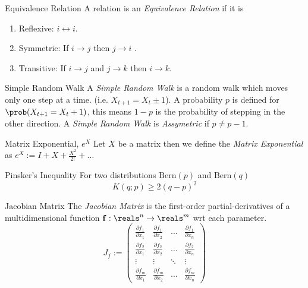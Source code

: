 \documentclass[11pt,a4paper]{article}
\begin{document}
  \begin{definition}{Equivalence Relation}
    A relation is an \textit{Equivalence Relation} if it is
    \begin{enumerate}
      \item Reflexive: $i\leftrightarrow i$.
      \item Symmetric: If $i\to j$ then $j\to i$ .
      \item Transitive: If $i\to j$ and $j\to k$ then $i\to k$.
    \end{enumerate}
  \end{definition}

  \begin{definition}{Simple Random Walk}
    A \textit{Simple Random Walk} is a random walk which moves only one step at a time. (i.e. $X_{t+1}=X_t\pm1$). A probability $p$ is defined for $\prob(X_{t+1}=X_t+1)$, this means $1-p$ is the probability of stepping in the other direction. A \textit{Simple Random Walk} is \textit{Assymetric} if $p\neq p-1$.
  \end{definition}

  \begin{definition}{Matrix Exponential, $e^X$}
    Let $X$ be a matrix then we define the \textit{Matrix Exponential} as $e^X:=I+X+\frac{X^2}{2!}+\dots$
  \end{definition}

  \begin{theorem}{Pinsker's Inequality}
    For two distributions $\text{Bern}(p)$ and $\text{Bern}(q)$
    \[ K(q;p)\geq2(q-p)^2 \]
  \end{theorem}

  \begin{definition}{Jacobian Matrix}
    The \textit{Jacobian Matrix} is the first-order partial-derivatives of a multidimensional function $\mathbf{f}:\reals^n\to\reals^m$ wrt each parameter.
    \[ J_f:=\begin{pmatrix}
      \frac{\partial f_1}{\partial x_1}&\frac{\partial f_1}{\partial x_2}&\dots&\frac{\partial f_1}{\partial x_n}\\
      \frac{\partial f_2}{\partial x_1}&\frac{\partial f_2}{\partial x_2}&\dots&\frac{\partial f_2}{\partial x_n}\\
      \vdots&\vdots&\ddots&\vdots\\
      \frac{\partial f_m}{\partial x_1}&\frac{\partial f_m}{\partial x_2}&\dots&\frac{\partial f_m}{\partial x_n}
    \end{pmatrix}\]
  \end{definition}
\end{document}
